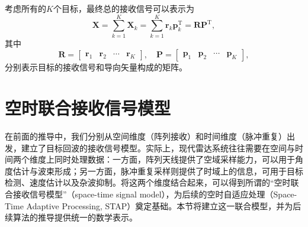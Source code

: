 考虑所有的\( K \)个目标，最终总的接收信号可以表示为
\[
    \mathbf{X} = \sum_{k=1}^{K} \mathbf{X}_k = \sum_{k=1}^{K} \bm{r}_k \bm{p}_k^{\mathrm{T}} = \mathbf{R} \mathbf{P}^{\mathrm{T}},
\]
其中
\[
    \mathbf{R} = \begin{bmatrix}
        \bm{r}_1 & \bm{r}_2 & \cdots & \bm{r}_K
    \end{bmatrix}, \quad \mathbf{P} = \begin{bmatrix}
        \bm{p}_1 & \bm{p}_2 & \cdots & \bm{p}_K
    \end{bmatrix},
\]
分别表示目标的接收信号和导向矢量构成的矩阵。

\section{空时联合接收信号模型}

在前面的推导中，我们分别从空间维度（阵列接收）和时间维度（脉冲重复）出发，建立了目标回波的接收信号模型。实际上，现代雷达系统往往需要在空间与时间两个维度上同时处理数据：一方面，阵列天线提供了空域采样能力，可以用于角度估计与波束形成；另一方面，脉冲重复采样则提供了时域上的信息，可用于目标检测、速度估计以及杂波抑制。将这两个维度结合起来，可以得到所谓的``空时联合接收信号模型''（space-time signal model），为后续的空时自适应处理（Space-Time Adaptive Processing, STAP）奠定基础。本节将建立这一联合模型，并为后续算法的推导提供统一的数学表示。

